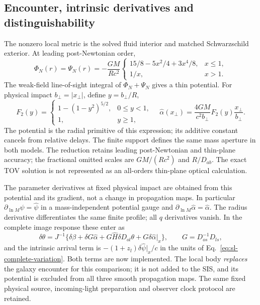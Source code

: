 \subsection{Encounter, intrinsic derivatives and distinguishability}
The nonzero local metric is the solved fluid interior and matched
Schwarzschild exterior. At leading post-Newtonian order,
\begin{equation}
 \Phi_N(r)=\Psi_N(r)=
 -\frac{GM}{Rc^2}\begin{cases}
 15/8-5x^2/4+3x^4/8,&x\leq1,\\1/x,&x>1 .
 \end{cases}
\end{equation}
The weak-field line-of-sight integral of $\Phi_N+\Psi_N$ gives a thin
potential. For physical impact $b_\perp=|x_\perp|$, define $y=b_\perp/R$,
\begin{equation}
 F_2(y)=\begin{cases}1-(1-y^2)^{5/2},&0\leq y<1,\\1,&y\geq1,\end{cases}
 \quad
 \widehat\alpha(x_\perp)=\frac{4GM}{c^2b_\perp}F_2(y)
                         \frac{x_\perp}{b_\perp} .
 \label{eq:sl-finite-alpha}
\end{equation}
The potential is the radial primitive of this expression; its additive
constant cancels from relative delays. The finite support defines the
same mass aperture in both models. The reduction retains leading
post-Newtonian and thin-plane accuracy; the fractional omitted scales
are $GM/(Rc^2)$ and $R/D_{ab}$. The exact TOV solution is not represented
as an all-orders thin-plane optical calculation.

The parameter derivatives at fixed physical impact are obtained from
this potential and its gradient, not a change in propagation maps.
In particular $\partial_{\ln M}\widehat\psi=\widehat\psi$ in a
mass-independent potential gauge and
$\partial_{\ln M}\widehat\alpha=\widehat\alpha$.
The radius derivative differentiates the same finite profile; all
$q$ derivatives vanish. In the complete image response these enter as
\begin{equation}
 \delta\theta=J^{-1}\{\delta\beta+\delta G\widehat\alpha
       +G\widehat H\delta D_{ol}\theta
       +G\delta\widehat\alpha|_x\},
 \qquad G=D_{os}^{-1}D_{ls},
\end{equation}
and the intrinsic arrival term is
$-(1+z_l)\delta\widehat\psi|_x/c$ in the units of
Eq.~\eqref{eq:sl-complete-variation}. Both terms are now implemented.
The local body \emph{replaces} the galaxy encounter for this comparison;
it is not added to the SIS, and its potential is excluded from all three
smooth propagation maps. The same fixed physical source, incoming-light
preparation and observer clock protocol are retained.

